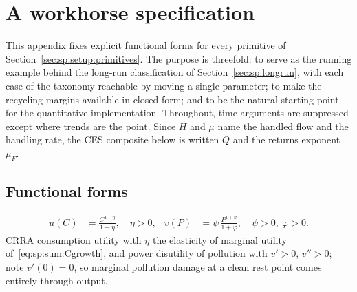 \section{A workhorse specification}\label{sec:app:workhorse}

This appendix fixes explicit functional forms for every primitive of Section~\ref{sec:sp:setup:primitives}. The purpose is threefold: to serve as the running example behind the long-run classification of Section~\ref{sec:sp:longrun}, with each case of the taxonomy reachable by moving a single parameter; to make the recycling margins available in closed form; and to be the natural starting point for the quantitative implementation. Throughout, time arguments are suppressed except where trends are the point. Since $H$ and $\mu$ name the handled flow and the handling rate, the CES composite below is written $Q$ and the returns exponent $\mu_F$.

\subsection{Functional forms}\label{sec:app:workhorse:forms}

\begin{align}
u\left(C\right) &= \frac{C^{1-\eta}}{1-\eta},\quad \eta>0,
&
v\left(P\right) &= \psi\,\frac{P^{1+\varphi}}{1+\varphi},\quad \psi>0,\ \varphi>0.
\label{eq:app:wh:preferences}
\end{align}
CRRA consumption utility with $\eta$ the elasticity of marginal utility of~\eqref{eq:sp:sum:Cgrowth}, and power disutility of pollution with $v'>0$, $v''>0$; note $v'\left(0\right)=0$, so marginal pollution damage at a clean rest point comes entirely through output.

